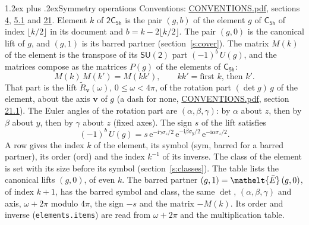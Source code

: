 \documentclass[10pt,a4paper]{article}
\makeatletter
\renewcommand\section{\@startsection{section}{1}{\z@}{-3ex plus -1ex minus -.2ex}%
  {1.2ex plus .2ex}{\normalfont\large\sffamily\bfseries\color{parttitle}}}
\numberwithin{equation}{section}
\newcommand{\eltfont}[1]{{\let\sigma\eltsigma\mathelt{#1}}}
\newcommand{\grp}[1]{\mathsf{#1}}
\newcommand{\elt}[1]{\eltfont{#1}}
\newcommand{\vv}{\mathbf{v}}
\newcommand{\iunit}{\mathrm{i}}
\newcommand{\expe}{\mathrm{e}}
\newcommand{\barred}[1]{\bar{#1}}
\newcommand{\lift}[1]{\tilde{#1}}
\newcommand{\pauli}[1]{\sigma_{#1}}
\makeatother
\begin{document}
\section{Symmetry operations}\label{s:elements}
Conventions: \href{../../CONVENTIONS.pdf}{CONVENTIONS.pdf}, sections \href{../../../rotation/CONVENTIONS.pdf\#conv.4}{4}, \href{../../../rotation/CONVENTIONS.pdf\#conv.5.1}{5.1} and \href{../../CONVENTIONS.pdf\#conv.21}{21}.
\leavevmode\label{n:index.element}\label{n:element.g}Element $k$ of $\grp{2C_{5h}}$ is the pair $(g, b)$ of the element $g$ of \href{../../../rotation/data/pdf/C5h.pdf}{$\grp{C_{5h}}$} of index $\lfloor k/2\rfloor$ in its document and $b = k - 2\lfloor k/2\rfloor$. The pair $(g, 0)$ is the canonical lift of $g$, and $(g, 1)$ is its barred partner (section~\ref{s:cover}). \label{n:matrix.element.pin}\label{n:matrix.element}The matrix $M(k)$ of the element is the transpose of its $\grp{SU(2)}$ part $(-1)^{b}\,U(g)$, and the matrices compose as the matrices $P(g)$ of the elements of $\grp{C_{5h}}$:
\begin{equation}\label{e:mprod}M(k)\,M(k') = M(kk'),\qquad kk' = \text{first } k\text{, then } k'.\end{equation}
\leavevmode\label{n:angle.omega}\label{n:vector.axis}\label{n:vector.pole}That part is the lift $\lift{R}_{\vv}(\omega)$, $0 \le \omega < 4\pi$, of the rotation part $(\det g)\,g$ of the element, about the axis $\vv$ of $g$ (a dash for none, \href{../../CONVENTIONS.pdf}{CONVENTIONS.pdf}, section \href{../../CONVENTIONS.pdf\#conv.21.1}{21.1}). \label{n:angle.euler.alpha}\label{n:angle.euler.beta}\label{n:angle.euler.gamma}\label{n:vector.coordinates}The Euler angles of the rotation part are $(\alpha,\beta,\gamma)$: by $\alpha$ about $z$, then by $\beta$ about $y$, then by $\gamma$ about $z$ (fixed axes). \label{n:local.euler.sign}The sign $s$ of the lift satisfies
\begin{equation}\label{e:euler}(-1)^{b}\,U(g) = s\,\expe^{-\iunit\gamma\pauli{z}/2}\,\expe^{-\iunit\beta\pauli{y}/2}\,\expe^{-\iunit\alpha\pauli{z}/2}.\end{equation}
\leavevmode\label{n:index.element.inverse}\label{n:head.sym}\label{n:head.ord}A row gives the index $k$ of the element, its symbol (sym, barred for a barred partner), its order (ord) and the index $k^{-1}$ of its inverse. \label{n:head.class}The class of the element is set with its size before its symbol (section~\ref{s:classes}).
The table lists the canonical lifts $(g, 0)$, of even $k$. The barred partner $(g, 1) = \elt{\barred{E}}\,(g, 0)$, of index $k + 1$, has the barred symbol and class, the same $\det$, $(\alpha,\beta,\gamma)$ and axis, $\omega + 2\pi$ modulo $4\pi$, the sign $-s$ and the matrix $-M(k)$. Its order and inverse (\texttt{elements.items}) are read from $\omega + 2\pi$ and the multiplication table.
\end{document}
